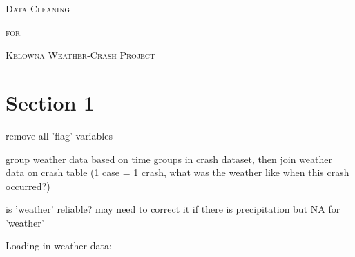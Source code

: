 \documentclass[11pt, a4paper]{article}
\begin{document}


\begin{center}
\Large{\textsc{Data Cleaning}}
\par
\normalsize{\textsc{for}}
\par
\large{\textsc{Kelowna Weather-Crash Project}}
\end{center}


\vspace{0.917 pc} %

\section*{Section 1}


remove all 'flag' variables

group weather data based on time groups in crash dataset, then join weather data on crash table (1 case = 1 crash, what was the weather like when this crash occurred?)

is 'weather' reliable? may need to correct it if there is precipitation but NA for 'weather'

Loading in weather data:
\end{document}
